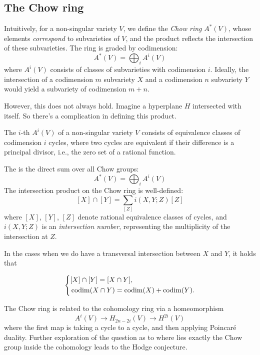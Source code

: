\documentclass[12pt]{memoir}
\begin{document}
\subsection{The Chow ring}
Intuitively, for a non-singular variety $V$, we define the \emph{Chow ring} $A^\ast(V)$, whose elements \emph{correspond} to subvarieties of $V$, and the product reflects the intersection of these subvarieties. The ring is graded by codimension:
$$A^\ast(V) = \bigoplus_i A^i(V)$$
where $A^i(V)$ consists of classes of subvarieties with codimension $i$. Ideally, the intersection of a codimension $m$ subvariety $X$ and a codimension $n$ subvariety $Y$ would yield a subvariety of codimension $m+n$.\par
However, this does not always hold. Imagine a hyperplane $H$ intersected with itself. So there's a complication in defining this product.

\begin{Def}
    The $i$-th  $A^i(V)$ of a non-singular variety $V$ consists of equivalence classes of codimension $i$ cycles, where two cycles are equivalent if their difference is a principal divisor, i.e., the zero set of a rational function.
\end{Def}

The  is the direct sum over all Chow groups:
$$A^\ast(V) = \bigoplus_i A^i(V)$$
The intersection product on the Chow ring is well-defined:
$$[X] \cap [Y] = \sum_{[Z]} i(X, Y; Z) [Z]$$
where $[X]$, $[Y]$, $[Z]$ denote rational equivalence classes of cycles, and $i(X, Y; Z)$ is an \emph{intersection number}, representing the multiplicity of the intersection at $Z$.

\begin{Rmk}
In the cases when we do have a transversal intersection between $X$ and $Y$, it holds that 

$$
\left\lbrace
\begin{aligned}
&[X]\cap[Y]=[X\cap Y],\\
&\operatorname{codim}(X\cap Y)=\operatorname{codim}(X)+\operatorname{codim}(Y).
\end{aligned}
\right.
$$

\end{Rmk}

\begin{Rmk}
    The Chow ring is related to the cohomology ring via a homeomorphism 
    $$A^i(V)\to H_{2n-2i}(V)\to H^{2i}(V)$$
    where the first map is taking a cycle to a cycle, and then applying Poincaré duality. Further exploration of the question as to where lies exactly the Chow group inside the cohomology leads to the Hodge conjecture.
\end{Rmk}
\end{document}
